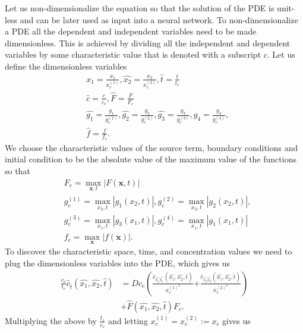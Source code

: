 \documentclass[\main/thesis.tex]{subfiles}
\begin{document}
Let us non-dimensionalize the equation so that the solution of the PDE is unit-less and can be later used as input into a neural network. To non-dimensionalize a PDE all the dependent and independent variables need to be made dimensionless. This is achieved by dividing all the independent and dependent variables by some characteristic value that is denoted with a subscript $c$. Let us define the dimensionless variables
\begin{align}
&\hat{x_1} {=} \frac{x_1}{x_c^{(1)}}, \hat{x_2} {=} \frac{x_2}{x_c^{(2)}}, 
\hat{t} {=} \frac{t}{t_c} \label{eq:dimensionlessIndepenVars}\\
&\hat{c} {=} \frac{c}{c_c}, \hat{F} {=} \frac{F}{F_c} \label{eq:dimensionlessPDEDependVars}\\
&\hat{g_1} {=} \frac{g_1}{g_c^{(1)}}, \hat{g_2} {=} \frac{g_2}{g_c^{(2)}}, 
\hat{g_3} {=} \frac{g_3}{g_c^{(3)}}, \hat{g_4} {=} \frac{g_4}{g_c^{(4)}}, 
\label{eq:dimensionlessBCVars}\\
&\hat{f} = \frac{f}{f_c}. \label{eq:dimensionlessICVar}
\end{align}
We choose the characteristic values of the source term, boundary conditions and initial condition to be the absolute value of the maximum value of the functions so that
\begin{align}
&F_c {=} \max_{\boldsymbol{x}, t} | F(\boldsymbol{x}, t) | \label{eq:characteristicSourceTerm}\\
&g_c^{(1)} {=} \max_{x_2, t} | g_1(x_2, t) |, g_c^{(2)} {=} \max_{x_2, t} | g_2(x_2, t) |,
\label{eq:characteristicBC1}\\
&g_c^{(3)} {=} \max_{x_1, t} | g_3(x_1, t) |, g_c^{(4)} {=} \max_{x_1, t} | g_1(x_1, t) |
\label{eq:characteristicBC2}\\
&f_c {=} \max_{\boldsymbol{x}} | f(\boldsymbol{x}) |. \label{eq:characteristicIC}
\end{align}
To discover the characteristic space, time, and concentration values we need to plug the dimensionless variables into the PDE, which gives us
\begin{align*}
\frac{c_c}{t_c} \hat{c}_{\hat{t}}(\hat{x_1}, \hat{x_2}, \hat{t}) 
&{=} D c_c \left ( \frac{\hat{c}_{\hat{x_1}\hat{x_1}}(\hat{x_1}, \hat{x_2}, \hat{t})}{x_c^{{(1)^2}}} \right.
\left. {+} \frac{\hat{c}_{\hat{x_2}\hat{x_2}}(\hat{x_1}, \hat{x_2}, \hat{t})}{x_c^{{(2)}^2}} \right)\\
&{+} \hat{F}(\hat{x_1}, \hat{x_2}, \hat{t}) F_c.
\end{align*}
Multiplying the above by $\frac{t_c}{c_c}$ and letting $x_c^{(1)} = x_c^{(2)} := x_c$ gives us
\end{document}
